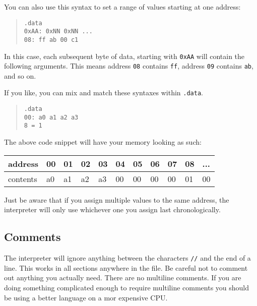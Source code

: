 \documentclass[12pt, oneside]{memoir}
\newcommand{\header}[1]{{\color{header}\texttt{#1}}}
\begin{document}
You can also use this syntax to set a range of values starting at one address:

\begin{quotation}\texttt{\header{.data}\\
    {\color{imm}0xAA}: {\color{imm}0xNN} {\color{imm}0xNN} ...\\
    {\color{imm}08}: {\color{imm}ff} {\color{imm}ab} {\color{imm}00} {\color{imm}c1}
}\end{quotation}

In this case, each subsequent byte of data, starting with \texttt{{\color{imm}0xAA}} will contain the following arguments. This means address \texttt{{\color{imm}08}} contains \texttt{{\color{imm}ff}}, address \texttt{{\color{imm}09}} contains \texttt{{\color{imm}ab}}, and so on.

If you like, you can mix and match these syntaxes within \header{.data}.
\begin{quotation}\texttt{\header{.data}\\
    {\color{imm}00}: {\color{imm}a0} {\color{imm}a1} {\color{imm}a2} {\color{imm}a3}\\
    {\color{imm}8} = {\color{imm}1}
}\end{quotation}
The above code snippet will have your memory looking as such:
\begin{table}[H]
    \begin{tabular}{|l|l|l|l|l|l|l|l|l|l|l|}
    \hline
    address  & 00 & 01 & 02 & 03 & 04 & 05 & 06 & 07 & 08 & ... \\ \hline
    contents & a0 & a1 & a2 & a3 & 00 & 00 & 00 & 00 & 01 & 00  \\ \hline
    \end{tabular}
\end{table}

Just be aware that if you assign multiple values to the same address, the interpreter will only use whichever one you assign last chronologically.

\subsection{Comments}
The interpreter will ignore anything between the characters \texttt{//} and the end of a line. This works in all sections anywhere in the file. Be careful not to comment out anything you actually need. There are no multiline comments. If you are doing something complicated enough to require multiline comments you should be using a better language on a mor expensive CPU.
\end{document}

